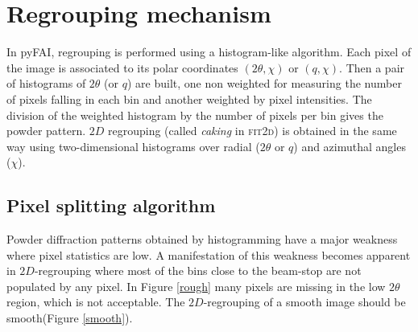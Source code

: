 \documentclass[a4paper]{jpconf}
\begin{document}
\section{Regrouping mechanism}
In pyFAI, regrouping is performed using a histogram-like algorithm.
Each pixel of the image is associated to its polar coordinates
$(2\theta , \chi )$ or $(q, \chi )$. Then a pair of histograms of $2\theta$
(or $q$) are built, one non weighted for measuring the number of pixels falling in each bin and
another weighted by pixel intensities.
The division of the weighted histogram by the number of pixels per bin gives
the powder pattern.
$2D$ regrouping (called \textit{caking} in \textsc{fit2d}) is obtained in the
same way using two-dimensional histograms over radial ($2\theta$ or $q$) and azimuthal angles
($\chi$).

\subsection{Pixel splitting algorithm}
Powder diffraction patterns obtained by histogramming have a major weakness where
pixel statistics are low.
A manifestation of this weakness becomes apparent in $2D$-regrouping where most of
the bins close to the beam-stop are not populated by any pixel.
In Figure \ref{rough} many pixels are missing in the low $2\theta$ region,
which is not acceptable.
The  $2D$-regrouping of a smooth image should be smooth(Figure \ref{smooth}).
\end{document}
